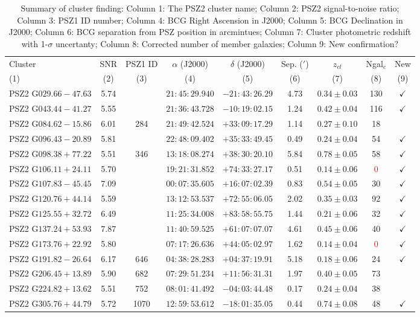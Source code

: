 \documentclass[apj, revtex4-1]{emulateapj}
\newcommand{\editorial}[1]{\textcolor{red}{#1}}
\begin{document}
\begin{table}
	\caption[Summary of Cluster Finding]{Summary of cluster finding: Column 1: The PSZ2 cluster name; Column 2: PSZ2 signal-to-noise ratio; Column 3: PSZ1 ID number; Column 4: BCG Right Ascension in J2000; Column 5: BCG Declination in J2000; Column 6: BCG separation from PSZ position in arcmintues; Column 7: Cluster photometric redshift with 1-$\sigma$ uncertanty; Column 8: Corrected number of member galaxies; Column 9: New confirmation? }
	\centering
	\begin{tabular}{lcccccccc}
	\hline
	Cluster & SNR & PSZ1 ID & $\alpha$ (J2000) & $\delta$ (J2000) & Sep. ($'$) & $z_{cl}$ & Ngal$_c$ & New\\
	(1) & (2) & (3) & (4) & (5) & (6) & (7) & (8) & (9) \\
	\hline
	 PSZ2 G$029.66-47.63$ & 5.74 & \nd & $21:45:29.940$ & $-21:43:26.29$ & 4.73 & $0.34 \pm 0.03$ & 130 & $\checkmark$ \\
	 PSZ2 G$043.44-41.27$ & 5.55 & \nd & $21:36:43.728$ & $-10:19:02.15$ & 1.24 & $0.42 \pm 0.04$ & 116 & $\checkmark$ \\
	 PSZ2 G$084.62-15.86$ & 6.01 &      284 & $21:49:42.524$ & $+33:09:17.29$ & 1.14 & $0.27 \pm 0.10$ & 18 & \\
	 PSZ2 G$096.43-20.89$ & 5.81 & \nd & $22:48:09.402$ & $+35:33:49.45$ & 0.49 & $0.24 \pm 0.04$ & 54 & $\checkmark$ \\
	 PSZ2 G$098.38+77.22$ & 5.51 &      346 & $13:18:08.274$ & $+38:30:20.10$ & 5.84 & $0.78 \pm 0.05$ & 58 & $\checkmark$ \\
	 PSZ2 G$106.11+24.11$ & 5.70 & \nd & $19:21:31.852$ & $+74:33:27.17$ & 0.51 & $0.14 \pm 0.06$ & \editorial{0} & $\checkmark$ \\
	 PSZ2 G$107.83-45.45$ & 7.09 & \nd & $00:07:35.605$ & $+16:07:02.39$ & 0.83 & $0.54 \pm 0.05$ & 30 & $\checkmark$ \\
	 PSZ2 G$120.76+44.14$ & 5.59 & \nd & $13:12:53.537$ & $+72:55:06.05$ & 2.02 & $0.35 \pm 0.03$ & 92 & $\checkmark$ \\
	 PSZ2 G$125.55+32.72$ & 6.49 & \nd & $11:25:34.008$ & $+83:58:55.75$ & 1.44 & $0.21 \pm 0.06$ & 32 & $\checkmark$ \\
	 PSZ2 G$137.24+53.93$ & 7.87 & \nd & $11:40:59.525$ & $+61:07:07.07$ & 4.61 & $0.45 \pm 0.06$ & 40 & $\checkmark$ \\
	 PSZ2 G$173.76+22.92$ & 5.80 & \nd & $07:17:26.636$ & $+44:05:02.97$ & 1.62 & $0.14 \pm 0.04$ & \editorial{0} & $\checkmark$ \\
	 PSZ2 G$191.82-26.64$ & 6.17 &      646 & $04:38:28.283$ & $+04:37:19.91$ & 5.18 & $0.18 \pm 0.06$ & 24 & $\checkmark$ \\
	 PSZ2 G$206.45+13.89$ & 5.90 &      682 & $07:29:51.234$ & $+11:56:31.31$ & 1.97 & $0.40 \pm 0.05$ & 73 & \\
	 PSZ2 G$224.82+13.62$ & 5.51 &      752 & $08:01:41.492$ & $-04:03:44.48$ & 0.17 & $0.24 \pm 0.04$ & 38 & \\
	 PSZ2 G$305.76+44.79$ & 5.72 &     1070 & $12:59:53.612$ & $-18:01:35.05$ & 0.44 & $0.74 \pm 0.08$ & 48 & $\checkmark$ \\
	\hline
	\end{tabular}
\label{tbl:results}
\end{table}
\end{document}
